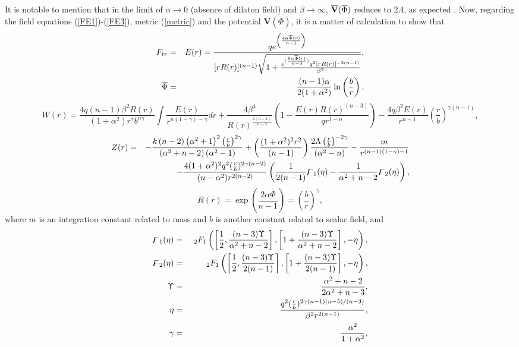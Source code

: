 \documentclass[aps,onecolumn ]{revtex4}
\begin{document}
It is notable to mention that in the limit of $\alpha \rightarrow 0$
(absence of dilaton field) and $\beta \rightarrow \infty $, $\mathbf{%
\overline{V}}(\overline{\Phi })$ reduces to $2\Lambda$, as expected \cite%
{pakravan}. Now, regarding the field equations (\ref{FE1})-(\ref{FE3}),
metric (\ref{metric}) and the potential $\mathbf{\overline{V}}(\overline{\Phi%
})$, it is a matter of calculation to show that
\begin{eqnarray}
F_{tr} &=&E(r)=\frac{qe^{\left( \frac{4\alpha \overline{\Phi }(r)}{n-1}%
\right) }}{[r R(r)]^{(n-1)}\sqrt{1+\frac{e^{(\frac{8\alpha \overline{\Phi }%
(r)}{n-3})}q^{2}[r R(r)]^{-2(n-1)}}{\beta ^{2}}}},  \label{E} \\
\overline{\Phi } &=&\frac{(n-1)\alpha }{2(1+\alpha ^{2})}\ln \left( \frac{b}{%
r}\right),  \label{phi}
\end{eqnarray}%
\begin{equation}
W(r)=\frac{4q(n-1)\beta ^{2}R(r)}{\left( 1+\alpha ^{2}\right) r^{\gamma
}b^{n\gamma }}\int \frac{E(r)}{r^{n(1-\gamma )-\gamma }}dr+\frac{4\beta ^{4}%
}{R(r)^{\frac{2(n+1)}{n-3}}}\left( 1-\frac{E(r)R(r)^{(n-3)}}{qr^{1-n}}%
\right) -\frac{4q\beta ^{2}E(r)}{r^{n-1}}(\frac{r}{b})^{\gamma (n-1)},
\label{W}
\end{equation}%
\begin{eqnarray}
Z(r) &=&-\frac{k\left( n-2\right) \left( \alpha ^{2}+1\right)
^{2}\left( \frac{r}{b}\right)^{2\gamma }}{\left( \alpha
^{2}+n-2\right) \left( \alpha
^{2}-1\right) }+\left( \frac{(1+\alpha ^{2})^{2}r^{2}}{(n-1)}\right) \frac{%
2\Lambda \left( \frac{r}{b}\right) ^{-2\gamma }}{(\alpha ^{2}-n)}-\frac{m}{%
r^{(n-1)(1-\gamma )-1}}  \nonumber \\
&&-\frac{4(1+\alpha ^{2})^{2}q^{2}(\frac{r}{b})^{2\gamma (n-2)}}{(n-\alpha
^{2})r^{2(n-2)}}\left( \frac{1}{2(n-1)}\digamma _{1}(\eta )-\frac{1}{\alpha
^{2}+n-2}\digamma _{2}(\eta )\right),  \label{f}
\end{eqnarray}
\begin{equation}
R(r)= \exp \left( \frac{2\alpha \overline{\Phi }}{n-1}\right) =\left( \frac{b%
}{r}\right)^{\gamma },  \label{R(r)}
\end{equation}
where $m$ is an integration constant related to mass and $b$ is another
constant related to scalar field, and
\begin{eqnarray}
\digamma _{1}(\eta ) &=&\text{ }_{2}F_{1}\left( \left[ \frac{1}{2},\frac{%
(n-3)\Upsilon }{\alpha ^{2}+n-2}\right] ,\left[ 1+\frac{(n-3)\Upsilon }{%
\alpha ^{2}+n-2}\right] ,-\eta \right) ,  \nonumber \\
\digamma _{2}(\eta ) &=&\text{ }_{2}F_{1}\left( \left[ \frac{1}{2},\frac{%
(n-3)\Upsilon }{2(n-1)}\right] ,\left[ 1+\frac{(n-3)\Upsilon }{2(n-1)}\right]
,-\eta \right) ,  \nonumber \\
\Upsilon &=&\frac{\alpha ^{2}+n-2}{2\alpha ^{2}+n-3},  \nonumber \\
\eta &=&\frac{q^{2}(\frac{r}{b})^{2\gamma (n-1)(n-5)/(n-3)}}{\beta
^{2}r^{2(n-1)}},  \nonumber \\
\gamma&=& \frac{\alpha^2}{1+\alpha^2},   \nonumber
\end{eqnarray}
\end{document}
